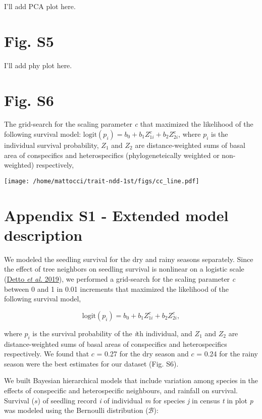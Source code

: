 \documentclass[
  12pt,
  letterpaper,
  DIV=11,
  numbers=noendperiod]{scrartcl}
\begin{document}
I'll add PCA plot here.

\newpage

\hypertarget{fig.-s5}{%
\section{Fig. S5}\label{fig.-s5}}

I'll add phy plot here.

\newpage

\hypertarget{fig.-s6}{%
\section{Fig. S6}\label{fig.-s6}}

The grid-search for the scaling parameter \emph{c} that maximized the
likelihood of the following survival model:
\(\mathrm{logit}(p_i) = b_0 + b_1 Z_{1i}^c + b_2 Z_{2i}^c\), where
\(p_i\) is the individual survival probability, \(Z_1\) and \(Z_2\) are
distance-weighted sums of basal area of conspecifics and heterospecifics
(phylogeneteically weighted or non-weighted) respectively,

\texttt{[image: /home/mattocci/trait-ndd-1st/figs/cc\_line.pdf]}

\newpage

\hypertarget{appendix-s1---extended-model-description}{%
\section{Appendix S1 - Extended model
description}\label{appendix-s1---extended-model-description}}

We modeled the seedling survival for the dry and rainy seasons
separately. Since the effect of tree neighbors on seedling survival is
nonlinear on a logistic scale (\protect\hyperlink{ref-Detto2019}{Detto
\emph{et al.} 2019}), we performed a grid-search for the scaling
parameter \emph{c} between 0 and 1 in 0.01 increments that maximized the
likelihood of the following survival model,

\[
\mathrm{logit}(p_i) = b_0 + b_1 Z_{1i}^c + b_2 Z_{2i}^c,
\]

where \(p_i\) is the survival probability of the \emph{i}th individual,
and \(Z_1\) and \(Z_2\) are distance-weighted sums of basal areas of
conspecifics and heterospecifics respectively. We found that \(c\) =
0.27 for the dry season and \(c\) = 0.24 for the rainy season were the
best estimates for our dataset (Fig. S6).

We built Bayesian hierarchical models that include variation among
species in the effects of conspecific and heterospecific neighbours, and
rainfall on survival. Survival (\(s\)) of seedling record \emph{i} of
individual \emph{m} for species \emph{j} in census \emph{t} in plot
\emph{p} was modeled using the Bernoulli distribution (\(\mathcal{B}\)):
\end{document}
